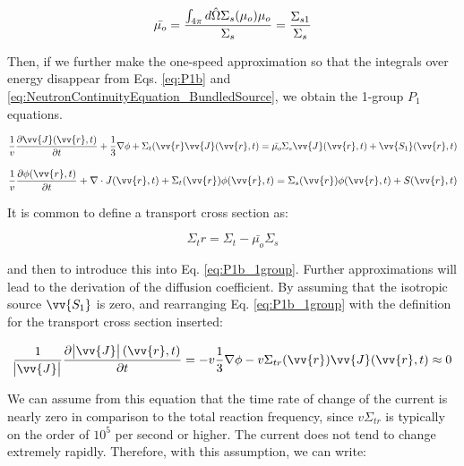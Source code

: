 \begin{equation}
\label{eq:IsotropicScatteringAngle}
\bar{\mu_o} = \frac{\int_{4\pi}^{} d\hat{\Omega}  \Sigma_s(\mu_o)\mu_o}{\Sigma_s} = \frac{\Sigma_{s1}}{\Sigma_s}
\end{equation}

Then, if we further make the one-speed approximation so that the integrals over energy disappear from Eqs. \ref{eq:P1b} and \ref{eq:NeutronContinuityEquation_BundledSource}, we obtain the 1-group \(P_1\) equations. 

\begin{equation}
\label{eq:P1b_1group}
\frac{1}{v} \frac{\partial\vv{J}(\vv{r}, t)}{\partial t} +
 \frac{1}{3}\nabla\phi + \Sigma_t(\vv{r}\vv{J}(\vv{r},t) = \bar{\mu_o}\Sigma_s\vv{J}(\vv{r}, t) + \vv{S_1}(\vv{r}, t)
\end{equation}

\begin{equation}
\label{eq:NeutronContinuityEquation_BundledSource_1group}
\frac{1}{v} \frac{\partial\phi(\vv{r}, t)}{\partial t} +
 \nabla\cdot J(\vv{r}, t) + 
 \Sigma_t(\vv{r})\phi(\vv{r}, t) = \Sigma_s(\vv{r})\phi(\vv{r}, t) + S(\vv{r}, t)
\end{equation}

It is common to define a transport cross section as:

\begin{equation}
\label{eq:TransportCrossSection}
\Sigma_tr=\Sigma_t-\bar{\mu_o}\Sigma_s
\end{equation}

and then to introduce this into Eq. \ref{eq:P1b_1group}. Further approximations will lead to the derivation of the diffusion coefficient. By assuming that the isotropic source \(\vv{S_1}\) is zero, and rearranging Eq. \ref{eq:P1b_1group} with the definition for the transport cross section inserted:

\begin{equation}
\label{eq:P1b_CurrentApproximation}
\frac{1}{\abs{{\vv{J}}}} \frac{\partial\abs{{\vv{J}}}(\vv{r}, t)}{\partial t} = - v\frac{1}{3}\nabla\phi - v\Sigma_{tr}(\vv{r})\vv{J}(\vv{r},t) \approx 0
\end{equation}

We can assume from this equation that the time rate of change of the current is nearly zero in comparison to the total reaction frequency, since \(v\Sigma_{tr}\) is typically on the order of \(10^5\) per second or higher. The current does not tend to change extremely rapidly. Therefore, with this assumption, we can write:

